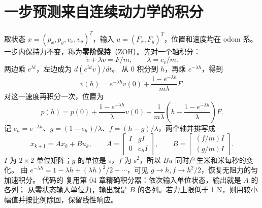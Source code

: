 \section{一步预测来自连续动力学的积分}
取状态 $x=(p_x,p_y,v_x,v_y)^T$，输入 $u=(F_x,F_y)^T$，位置和速度均在 odom 系。
一步内保持力不变，称为\textbf{零阶保持}（ZOH）。先对一个轴积分：
\[
 \dot v+\lambda v=F/m,\qquad\lambda=c_v/m.
\]
两边乘 $e^{\lambda t}$，左边成为 $d(e^{\lambda t}v)/dt$。
从 0 积分到 $h$，再乘 $e^{-\lambda h}$，得到
\[
 v(h)=e^{-\lambda h}v(0)+\frac{1-e^{-\lambda h}}{m\lambda}F.
\]
对这一速度再积分一次，位置为
\[
 p(h)=p(0)+\frac{1-e^{-\lambda h}}{\lambda}v(0)
 +\frac{1}{m\lambda}\left(h-\frac{1-e^{-\lambda h}}{\lambda}\right)F.
\]
记 $e_h=e^{-\lambda h}$、$g=(1-e_h)/\lambda$、$f=(h-g)/\lambda$，两个轴并排写成
\begin{equation}
 x_{k+1}=Ax_k+Bu_k,\qquad
 A=\begin{bmatrix}I&gI\\0&e_hI\end{bmatrix},\qquad
 B=\begin{bmatrix}(f/m)I\\(g/m)I\end{bmatrix}.\label{eq:mpczoh}
\end{equation}
$I$ 为 $2\times2$ 单位矩阵；$g$ 的单位是 s，$f$ 为 s$^2$，所以 $Bu$ 同时产生米和米每秒的变化。
由 $e^{-\lambda h}=1-\lambda h+(\lambda h)^2/2+\cdots$，可见
$g\to h,f\to h^2/2$，恢复无阻力的匀加速积分。
代码的  复用第 04 章精确积分器：依次输入单位状态，输出就是 $A$ 的各列；
从零状态输入单位力，输出就是 $B$ 的各列。若力上限低于 1 N，则用较小幅值并按比例除回，保留线性响应。

